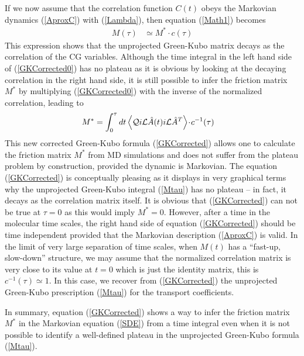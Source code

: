 \documentclass[b5paper,openright,10pt]{book}
\newcommand{\esc}{\!\cdot\!}
\newcommand{\llangle}{\left\langle}
\newcommand{\rrangle}{\right\rangle}
\begin{document}
If  we now  assume  that  the correlation  function  $C(t)$ obeys  the
Markovian   dynamics   (\ref{AproxC})    with   (\ref{Lambda}),   then
equation (\ref{Math1}) becomes
\begin{align}
M(\tau)&\simeq M^*\esc c(\tau)
\label{GKCorrected0}
\end{align}
This expression shows that the unprojected Green-Kubo matrix decays as the correlation
of the CG variables.
Although   the   time   integral   in    the   left   hand   side   of
(\ref{GKCorrected0}) has  no plateau as  it is obvious by  looking at
the decaying correlation in the right  hand side, it is still possible
to infer the friction matrix $M^*$ by multiplying (\ref{GKCorrected0})
with the inverse of the normalized correlation, leading to
\begin{align}
M^*&= \int_0^{\tau} dt \llangle {\cal Q} i{\cal L}\hat{A} (t)i{\cal L}\hat{A}^T\rrangle\esc  c^{-1}(\tau)
\label{GKCorrected}
\end{align}
This new  corrected Green-Kubo formula (\ref{GKCorrected})  allows one
to calculate  the friction matrix  $M^*$ from MD simulations  and does
not  suffer from  the plateau  problem by  construction, provided  the
dynamic is Markovian. The equation   (\ref{GKCorrected}) is conceptually pleasing
as it  displays in  very graphical terms  why the unprojected Green-Kubo
integral  (\ref{Mtau}) has  no plateau  -- in  fact, it  decays as  the
correlation matrix itself.  It is obvious that (\ref{GKCorrected}) can
not be true at $\tau=0$ as this would imply $M^*=0$. However, after a
time  in  the molecular  time  scales,  the  right  hand side  of  equation
(\ref{GKCorrected})  should  be  time independent  provided  that  the
Markovian description (\ref{AproxC})  is valid.  In the  limit of very
large  separation  of  time  scales,  when  $M(t)$  has  a  ``fast-up,
slow-down'' structure,  we may assume that  the normalized correlation
matrix is very close to its value  at $t=0$ which is just the identity
matrix, this  is $  c^{-1}(\tau)\simeq 1$.  In  this case,  we recover
from   (\ref{GKCorrected})   the unprojected   Green-Kubo   prescription
(\ref{Mtau}) for the transport coefficients.


In summary, equation (\ref{GKCorrected}) shows  a way to infer the friction
matrix  $M^*$  in  the  Markovian equation  (\ref{SDE})  from  a  time
integral  even when  it is  not  possible to  identify a  well-defined
plateau in the unprojected Green-Kubo formula (\ref{Mtau}).
\end{document}
